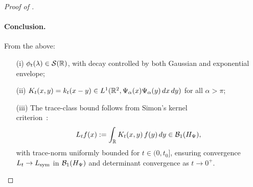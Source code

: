 \begin{proof}[Proof of ]
\paragraph{Conclusion.}
From the above:
\begin{itemize}
    \item[\textup{(i)}] \( \phi_t(\lambda) \in \mathcal{S}(\mathbb{R}) \), with decay controlled by both Gaussian and exponential envelope;
    \item[\textup{(ii)}] \( K_t(x,y) = k_t(x - y) \in L^1(\mathbb{R}^2, \Psi_\alpha(x)\Psi_\alpha(y)\, dx\,dy) \) for all \( \alpha > \pi \);
    \item[\textup{(iii)}] The trace-class bound follows from Simon's kernel\\ criterion~\cite[Thm.~4.2]{Simon2005TraceIdeals}:
    \[
    L_t f(x) := \int_{\mathbb{R}} K_t(x,y)\, f(y)\, dy \in \mathcal{B}_1(H_{\Psi}),
    \]
    with trace-norm uniformly bounded for \( t \in (0, t_0] \), ensuring convergence \( L_t \to L_{\mathrm{sym}} \) in \( \mathcal{B}_1(H_{\Psi}) \) and determinant convergence as \( t \to 0^+ \).
\end{itemize}
\end{proof}
